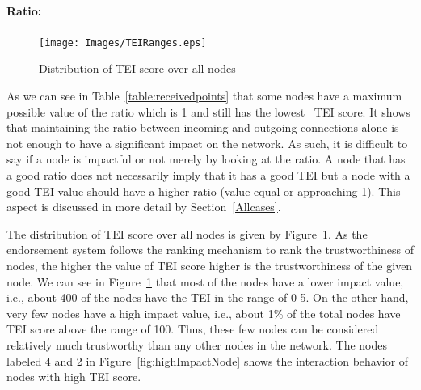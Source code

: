 \paragraph{Ratio:} \label{par:ratio}
\begin{figure}[H]
	\texttt{[image: Images/TEIRanges.eps]}
	\caption{Distribution of \ac{TEI} score over all nodes}
	\label{table:totalimpact}
\end{figure}
As we can see in Table~\ref{table:receivedpoints} that some nodes have a
maximum possible value of the ratio which is 1 and still has the lowest
~\ac{TEI} score. It shows that maintaining the ratio between incoming and
outgoing connections alone is not enough to have a significant impact on the
network. As such, it is difficult to say if a node is impactful or not merely
by looking at the ratio. A node that has a good ratio does not necessarily
imply that it has a good \ac{TEI} but a node with a good \ac{TEI} value should
have a higher ratio (value equal or approaching 1). This aspect is discussed in
more detail by Section~\ref{Allcases}. \par The distribution of \ac{TEI} score
over all nodes is given by Figure~\ref{table:totalimpact}. As the endorsement
system follows the ranking mechanism to rank the trustworthiness of nodes, the
higher the value of \ac{TEI} score higher is the trustworthiness of the given
node. We can see in Figure~\ref{table:totalimpact} that most of the nodes
have a lower impact value, i.e., about 400 of the nodes have the \ac{TEI} in
the range of 0-5. On the other hand, very few nodes have a high impact value,
i.e., about 1\% of the total nodes have \ac{TEI} score above the range of 100.
Thus, these few nodes can be considered relatively much trustworthy than any
other nodes in the network. The nodes labeled 4 and 2 in
Figure~\ref{fig:highImpactNode} shows the interaction behavior of nodes with
high \ac{TEI} score. 
